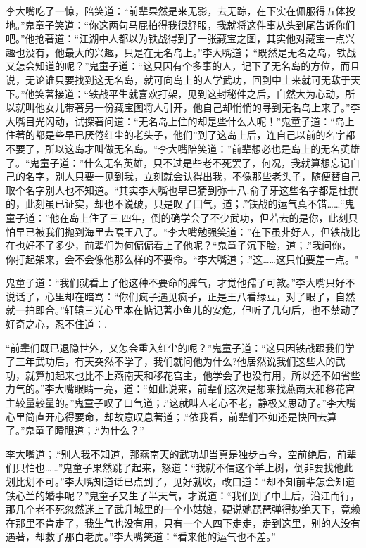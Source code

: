\documentclass[12pt,oneside]{book}
\begin{document}
李大嘴吃了一惊，陪笑道：``前辈果然是来无影，去无踪，在下实在佩服得五体投地。''鬼童子笑道：``你这两句马屁拍得我很舒服，我就将这件事从头到尾告诉你们吧。''他抢著道：``江湖中人都以为铁战得到了一张藏宝之图，其实他对藏宝一点兴趣也没有，他最大的兴趣，只是在无名岛上。''李大嘴道；.``既然是无名之岛，铁战又怎会知道的呢？''鬼童子道：``这只因有个多事的人，记下了无名岛的方位，而且说，无论谁只要找到这无名岛，就可向岛上的人学武功，回到中土来就可无敌于天下。''他笑著接道：``铁战平生就喜欢打架，见到这封秘件之后，自然大为心动，所以就叫他女儿带著另一份藏宝图将人引开，他自己却悄悄的寻到无名岛上来了。''李大嘴目光闪动，试探著问道：``无名岛上住的却是些什么人呢！''鬼童子道：``岛上住著的都是些早已厌倦红尘的老头子，他们''到了这岛上后，连自己以前的名字都不要了，所以这岛才叫做无名岛。``李大嘴陪笑道：''前辈想必也是岛上的无名英雄了。``鬼童子道：''什么无名英雄，只不过是些老不死罢了，何况，我就算想忘记自己的名字，别人只要一见到我，立刻就会认得出我，不像那些老头子，随便替自己取个名字别人也不知道。``其实李大嘴也早已猜到弥十八.俞子牙这些名字都是杜撰的，此刻虽已证实，却也不说破，只是叹了囗气，道；.''铁战的运气真不错\ldots\ldots{}``鬼童子道：''他在岛上住了三.四年，倒的确学会了不少武功，但若去的是你，此刻只怕早已被我们抛到海里去喂王八了。``李大嘴勉强笑道：''在下虽非好人，但铁战比在也好不了多少，前辈们为何偏偏看上了他呢？``鬼童子沉下脸，道；.''我问你，你打起架来，会不会像他那么样的不要命。``李大嘴道；.''这\ldots\ldots 这只怕要差一点。"

鬼童子道：``我们就看上了他这种不要命的脾气，才觉他孺子可教。''李大嘴只好不说话了，心里却在暗骂：``你们疯子遇见疯子，正是王八看绿豆，对了眼了，自然就一拍即合。''轩辕三光心里本在惦记著小鱼儿的安危，但听了几句后，也不禁动了好奇之心，忍不住道：.

``前辈们既已退隐世外，又怎会重入红尘的呢？''鬼童子道：``这只因铁战跟我们学了三年武功后，有天突然不学了，我们就问他为什么?他居然说我们这些人的武功，就算加起来也比不上燕南天和移花宫主，他学会了也没有用，所以还不如省些力气的。''李大嘴眼睛一亮，道：``如此说来，前辈们这次是想来找燕南天和移花宫主较量较量的。''鬼童子叹了口气道；.``这就叫人老心不老，静极又思动了。''李大嘴心里简直开心得要命，却故意叹息著道；.``依我看，前辈们不如还是快回去算了。''鬼童子瞪眼道；.``为什么？''

李大嘴道；.``别人我不知道，那燕南天的武功却当真是独步古今，空前绝后，前辈们只怕也\ldots\ldots{}''鬼童子果然跳了起来，怒道：``我就不信这个羊上树，倒非要找他此划比划不可。''李大嘴知道话已点到了，见好就收，改口道：``却不知前辈怎会知道铁心兰的婚事呢？''鬼童子又生了半天气，才说道：``我们到了中土后，沿江而行，那几个老不死忽然迷上了武升城里的一个小姑娘，硬说她琵琶弹得妙绝天下，竟赖在那里不肯走了，我生气也没有用，只有一个人四下走走，走到这里，别的人没有遇著，却救了那白老虎。''李大嘴笑道：``看来他的运气也不差。''
\end{document}
